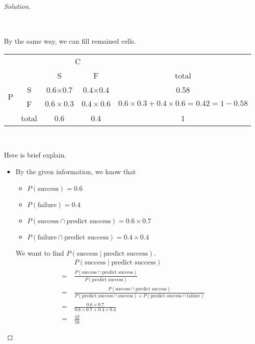\begin{proof} [Solution]
\begin{itemize}
\begin{table}[htb!]
\begin{tabular}{ccccc}
					\end{tabular}
				\end{table}\\
				By the same way, we can fill remained cells.
				\begin{table}[htb!]
					\setlength{\tabcolsep}{15pt}
					\renewcommand{\arraystretch}{2}
					\centering
					\begin{tabular}{ccccc}
						&                            & \multicolumn{2}{c}{C}      &       \\
						& \multicolumn{1}{c|}{}      & S & \multicolumn{1}{c|}{F} & total \\ \cline{2-5} 
						\multirow{2}{*}{P} & \multicolumn{1}{c|}{S}     & 0.6$\times$0.7 & \multicolumn{1}{c|}{0.4$\times$0.4} & 0.58    \\
						& \multicolumn{1}{c|}{F}     & $0.6\times0.3$ & \multicolumn{1}{c|}{$0.4\times0.6$} & \color{red}$0.6\times0.3 + 0.4\times0.6 = 0.42 = 1 - 0.58$     \\ \cline{2-5} 
						& \multicolumn{1}{c|}{total} & 0.6 & \multicolumn{1}{c|}{0.4} & 1    
					\end{tabular}
				\end{table}\\
		\end{itemize}
		Here is brief explain.
		\begin{itemize}
			\item [] By the given information, we know that
			\begin{itemize}
				\item [\textbullet] $P(\mbox{success}) = 0.6$
				\item [\textbullet] $P(\mbox{failure}) = 0.4$
				\item [\textbullet] $P(\mbox{success}\cap\mbox{predict success}) = 0.6\times0.7$
				\item [\textbullet] $P(\mbox{failure}\cap\mbox{predict success}) = 0.4\times0.4$
			\end{itemize}
			We want to find $P(\mbox{success} \mid\mbox{predict success})$.
			\begin{align*}
				& P(\mbox{success} \mid\mbox{predict success})\\
				=\ & \frac{P(\mbox{success}\cap\mbox{predict success})}{P(\mbox{predict success})}\\
				=\ & \frac{P(\mbox{success}\cap\mbox{predict success})}{P(\mbox{predict success}\cap\mbox{success}) + P(\mbox{predict success}\cap\mbox{failure})}\\
				=\ & \frac{0.6\times0.7}{0.6\times0.7 + 0.4\times0.4}\\
				=\ & \frac{42}{58}
			\end{align*}
		\end{itemize}
	\end{proof}